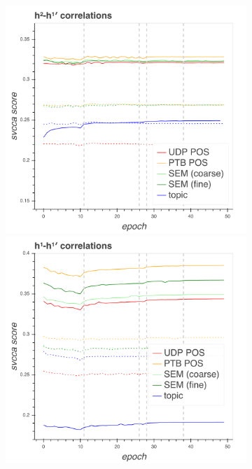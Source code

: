 \begin{figure}
\begin{subfigure}{.48\textwidth}
    \centering
    \includegraphics[width=\textwidth]{svcca/input_cca_2.png}
    \includegraphics[width=\textwidth]{svcca/input_cca_1.png}

\end{subfigure}
\end{figure}
